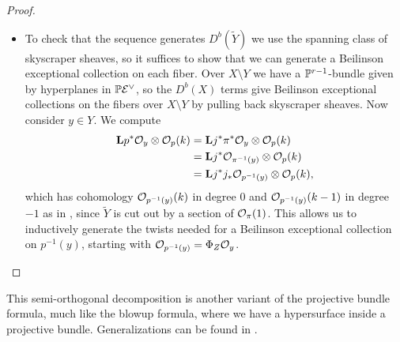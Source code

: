 \begin{proof}
\begin{itemize}
        \item To check that the sequence generates $D^b(\tilde Y)$ we use the
            spanning class of skyscraper sheaves, so it suffices to show that we
            can generate a Beilinson exceptional collection on each fiber. Over
            $X\setminus Y$ we have a $\P^{r-1}$-bundle given by hyperplanes in
            $\P\calE^\vee$, so the $D^b(X)$ terms give Beilinson exceptional
            collections on the fibers over $X\setminus Y$ by pulling back
            skyscraper sheaves.
            Now consider $y\in Y$. We compute
            \begin{align*}
                \dL p^*\O_y\otimes\O_p(k)
                    &= \dL j^*\pi^*\O_y\otimes\O_p(k) \\
                    &= \dL j^*\O_{\pi^{-1}(y)}\otimes\O_p(k) \\
                    &= \dL j^*j_*\O_{p^{-1}(y)}\otimes\O_p(k),
            \end{align*}
            which has cohomology $\O_{p^{-1}(y)}(k)$ in degree 0 and
            $\O_{p^{-1}(y)}(k-1)$ in degree $-1$ as in
            \cite[Cor 11.4]{Huybrechts}, since $\tilde Y$ is cut out by a
            section of $\O_\pi(1)$. This allows us to inductively generate the
            twists needed for a Beilinson exceptional collection on $p^{-1}(y)$,
            starting with $\O_{p^{-1}(y)}=\Phi_Z\O_y$.
    \end{itemize}
\end{proof}

\begin{remark}{}{}
    This semi-orthogonal decomposition is another variant of the projective
    bundle formula, much like the blowup formula, where we have a hypersurface
    inside a projective bundle. Generalizations can be found in
    \cite{kuznetsov_hpd_2005}.
\end{remark}


